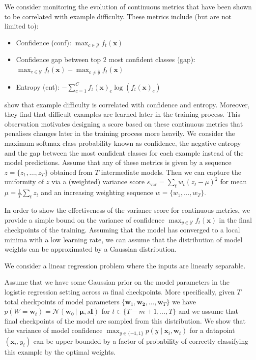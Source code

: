 We consider monitoring the evolution of continuous metrics that have been shown to be correlated with example difficulty. These metrics include (but are not limited to):
\begin{itemize}
	\item Confidence (conf): $\max _{c \in \mathcal{Y}} f_{t}(\bm{x})$
	\item Confidence gap between top 2 most confident classes (gap): $\max _{c \in \mathcal{Y}} f_{t}(\bm{x})  - \max _{c \not = \hat{y}} f_{t}(\bm{x})$
	\item Entropy (ent): $-\sum_{c=1}^C f_{t}(\bm{x})_c \log \left(f_{t}(\bm{x})_c\right)$
\end{itemize}
\cite{jiang2020characterizing} show that  
example difficulty is correlated with confidence and entropy. Moreover, they find that difficult examples are learned later in the training process. This observation motivates designing a score based on these continuous metrics that penalises changes later in the training process more heavily.
We consider the maximum softmax class probability known as confidence, the negative entropy and the gap between the most confident classes for each example instead of the model predictions. 
Assume that any of these metrics is given by a sequence $z = \{z_1,\ldots,z_T\}$ obtained from $T$ intermediate models. Then we can capture the uniformity of $z$ via a (weighted) variance score $s_\text{var} = \sum_{t} w_t (z_t - \mu)^2$ for mean $\mu = \frac{1}{T}\sum_{t} z_t$ and an increasing weighting sequence $w = \{w_1,\ldots,w_T\}$.

In order to show the effectiveness of the variance score \svar for continuous metrics, we provide a simple bound on the variance of confidence  $\max _{y \in \mathcal{Y}} f_{t}(\bm{x})$ in the final checkpoints of the training. 
Assuming that the model has converged to a local minima with a low learning rate, we can assume that the distribution of model weights can be approximated by a Gaussian distribution. 

We consider a linear regression problem where the inputs are linearly separable. 

\begin{lemma}
\label{lem:var-score}
Assume that we have some Gaussian prior on the model parameters in the logistic regression setting across $m$ final checkpoints. More specifically, given $T$ total checkpoints of model parameters $\{\bm{w}_1, \bm{w_2}, \dots, \bm{w}_T \}$ we have $p(W = \bm{w}_t) = \mathcal{N}(\bm{w}_0 \mid \bm{\mu}, s\bm{I}) $ for $t \in \{T - m + 1, \dots, T\}$ and we assume that final checkpoints of the model are sampled from this distribution. We show that the variance of model confidence $ \max_{y \in \{-1, 1\}} p(y \mid \bm{x}_i, \bm{w}_t)$ for a datapoint $(\bm{x}_i, y_i)$ can be upper bounded by a factor of probability of correctly classifying this example by the optimal weights. 

\end{lemma}


